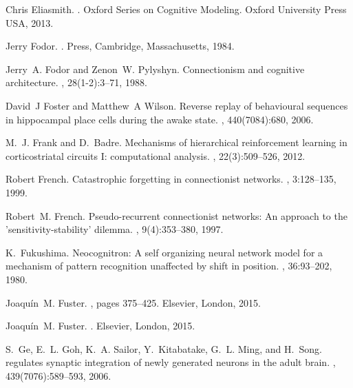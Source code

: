 \documentclass[letterpaper,11pt]{article}
\begin{document}
\begin{thebibliography}{100}
Chris Eliasmith.
.
\newblock Oxford Series on Cognitive Modeling. Oxford University Press {USA},
  2013.

Jerry Fodor.
.
 Press, Cambridge, Massachusetts, 1984.

Jerry~A. Fodor and Zenon~W. Pylyshyn.
\newblock Connectionism and cognitive architecture.
, 28(1-2):3--71, 1988.

David~J Foster and Matthew~A Wilson.
\newblock Reverse replay of behavioural sequences in hippocampal place cells
  during the awake state.
, 440(7084):680, 2006.

M.~J. Frank and D.~Badre.
\newblock Mechanisms of hierarchical reinforcement learning in corticostriatal
  circuits {I}: computational analysis.
, 22(3):509--526, 2012.

Robert French.
\newblock Catastrophic forgetting in connectionist networks.
, 3:128--135, 1999.

Robert~M. French.
\newblock Pseudo-recurrent connectionist networks: An approach to the
  'sensitivity-stability' dilemma.
, 9(4):353--380, 1997.

K.~Fukushima.
\newblock Neocognitron: {A} self organizing neural network model for a
  mechanism of pattern recognition unaffected by shift in position.
, 36:93--202, 1980.

Joaqu\'{i}n~M. Fuster.
, pages
  375--425.
\newblock Elsevier, London, 2015.

Joaqu\'{i}n~M. Fuster.
.
\newblock Elsevier, London, 2015.

S.~Ge, E.~L. Goh, K.~A. Sailor, Y.~Kitabatake, G.~L. Ming, and H.~Song.
 regulates synaptic integration of newly generated neurons in
  the adult brain.
, 439(7076):589--593, 2006.


\end{thebibliography}
\end{document}
